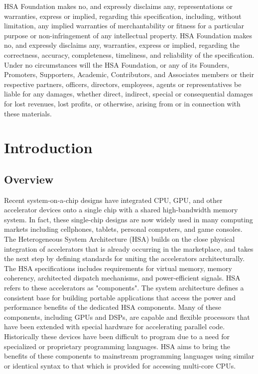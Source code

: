 \documentclass[draft]{book}
\begin{document}
HSA Foundation makes no, and expressly disclaims any, representations or
warranties, express or implied, regarding this specification, including, without
limitation, any implied warranties of merchantability or fitness for a
particular purpose or non-infringement of any intellectual property. HSA
Foundation makes no, and expressly disclaims any, warranties, express or
implied, regarding the correctness, accuracy, completeness, timeliness, and
reliability of the specification. Under no circumstances will the HSA
Foundation, or any of its Founders, Promoters, Supporters, Academic,
Contributors, and Associates members or their respective partners, officers,
directors, employees, agents or representatives be liable for any damages,
whether direct, indirect, special or consequential damages for lost revenues,
lost profits, or otherwise, arising from or in connection with these materials.

\clearpage {}
\tableofcontents
\clearpage

\setcounter{page}{1}

\chapter{Introduction} \label{index}\hypertarget{index}{}
\hypertarget{overview}{}\section{Overview}\label{overview}

Recent system-on-a-chip designs have integrated CPU, GPU, and other accelerator
devices onto a single chip with a shared high-bandwidth memory system. In fact,
these single-chip designs are now widely used in many computing markets
including cellphones, tablets, personal computers, and game consoles. The
Heterogeneous System Architecture (HSA) builds on the close physical integration
of accelerators that is already occurring in the marketplace, and takes the next
step by defining standards for uniting the accelerators architecturally. The
HSA specifications includes requirements for virtual memory, memory coherency,
architected dispatch mechanisms, and power-efficient signals. HSA refers to
these accelerators as "components". The system architecture defines a
consistent base for building portable applications that access the power and
performance benefits of the dedicated HSA components. Many of these components,
including GPUs and DSPs, are capable and flexible processors that have been
extended with special hardware for accelerating parallel code. Historically
these devices have been difficult to program due to a need for specialized or
proprietary programming languages. HSA aims to bring the benefits of these
components to mainstream programming languages using similar or identical syntax
to that which is provided for accessing multi-core CPUs.
\end{document}
